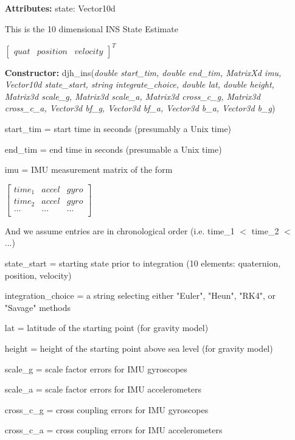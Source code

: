 \documentclass[11pt,a4paper]{article}
\begin{document}
	\begin{itemize}
		\item[\textbf{Attributes:}] state:  Vector10d

		This is the 10 dimensional INS State Estimate 
		
		$\left[\begin{array}{ccc}quat & position & velocity\end{array}\right]^T$
		
		\item[\textbf{Constructor:}] djh\_ins(\textit{double start\_tim, double end\_tim, MatrixXd imu, Vector10d state\_start, string integrate\_choice, double lat, double height, Matrix3d scale\_g, Matrix3d scale\_a, Matrix3d cross\_c\_g, Matrix3d cross\_c\_a, Vector3d bf\_g, Vector3d bf\_a, Vector3d b\_a, Vector3d b\_g})
		
		start\_tim = start time in seconds (presumably a Unix time)

        end\_tim = end time in seconds (presumable a Unix time)

        imu = IMU measurement matrix of the form
        
		$\left[\begin{array}{ccc}
					time_1 & accel & gyro \\
					time_2 & accel & gyro \\
					...    & ...   & ...  \\	
		\end{array}\right]$
        
        And we assume entries are in chronological order (i.e. time\_1 $<$ time\_2 $<$ ...)
        
        state\_start = starting state prior to integration (10 elements: quaternion, position, velocity)

        integration\_choice = a string selecting either "Euler", "Heun", "RK4", or "Savage" methods
        
        lat = latitude of the starting point (for gravity model)
        
        height = height of the starting point above sea level (for gravity model)
        
        scale\_g = scale factor errors for IMU gyroscopes

        scale\_a = scale factor errors for IMU accelerometers

        cross\_c\_g = cross coupling errors for IMU gyroscopes

        cross\_c\_a = cross coupling errors for IMU accelerometers


\end{itemize}
\end{document}
